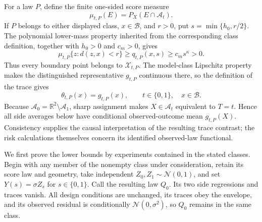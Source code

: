 For a law \(P\), define the finite one-sided score measure
\[
 \mu_{t,P}(E)=P_X(E\cap\mathcal A_t).
\]
If \(P\) belongs to either displayed class, \(x\in\mathcal B\), and \(r>0\), put \(s=\min\{h_0,r/2\}\).  The polynomial lower-mass property inherited from the corresponding class definition, together with \(h_0>0\) and \(c_m>0\), gives
\[
 \mu_{t,P}\{z:d(z,x)<r\}
 \ge q_{t,P}(x,s)
 \ge c_ms^{\kappa}>0. \tag{11}
\]
Thus every boundary point belongs to \(\mathcal X_{t,P}\).  The model-class Lipschitz property makes the distinguished representative \(g_{t,P}\) continuous there, so the definition of the trace gives
\[
 \theta_{t,P}(x)=g_{t,P}(x),
 \qquad t\in\{0,1\},\quad x\in\mathcal B. \tag{12}
\]
Because \(\mathcal A_0=\mathbb R^2\setminus\mathcal A_1\), sharp assignment makes \(X\in\mathcal A_t\) equivalent to \(T=t\).  Hence all side averages below have conditional observed-outcome mean \(g_{t,P}(X)\).  Consistency supplies the causal interpretation of the resulting trace contrast; the risk calculations themselves concern its identified observed-law functional.

We first prove the lower bounds by experiments contained in the stated classes.  Begin with any member of the nonempty class under consideration, retain its score law and geometry, take independent \(Z_0,Z_1\sim\mathcal N(0,1)\), and set \(Y(s)=\sigma Z_s\) for \(s\in\{0,1\}\).  Call the resulting law \(Q_0\).  Its two side regressions and traces vanish.  All design conditions are unchanged, its traces obey the envelope, and its observed residual is conditionally \(\mathcal N(0,\sigma^2)\), so \(Q_0\) remains in the same class.

